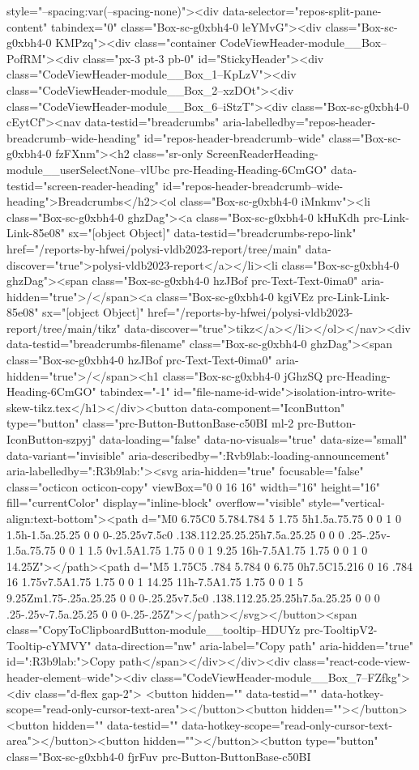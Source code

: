 {{{{{{{{{{{{{{{{{{{{{{{{{{{{{style="--spacing:var(--spacing-none)"><div data-selector="repos-split-pane-content" tabindex="0" class="Box-sc-g0xbh4-0 leYMvG"><div class="Box-sc-g0xbh4-0 KMPzq"><div class="container CodeViewHeader-module__Box--PofRM"><div class="px-3 pt-3 pb-0" id="StickyHeader"><div class="CodeViewHeader-module__Box_1--KpLzV"><div class="CodeViewHeader-module__Box_2--xzDOt"><div class="CodeViewHeader-module__Box_6--iStzT"><div class="Box-sc-g0xbh4-0 cEytCf"><nav data-testid="breadcrumbs" aria-labelledby="repos-header-breadcrumb--wide-heading" id="repos-header-breadcrumb--wide" class="Box-sc-g0xbh4-0 fzFXnm"><h2 class="sr-only ScreenReaderHeading-module__userSelectNone--vlUbc prc-Heading-Heading-6CmGO" data-testid="screen-reader-heading" id="repos-header-breadcrumb--wide-heading">Breadcrumbs</h2><ol class="Box-sc-g0xbh4-0 iMnkmv"><li class="Box-sc-g0xbh4-0 ghzDag"><a class="Box-sc-g0xbh4-0 kHuKdh prc-Link-Link-85e08" sx="[object Object]" data-testid="breadcrumbs-repo-link" href="/reports-by-hfwei/polysi-vldb2023-report/tree/main" data-discover="true">polysi-vldb2023-report</a></li><li class="Box-sc-g0xbh4-0 ghzDag"><span class="Box-sc-g0xbh4-0 hzJBof prc-Text-Text-0ima0" aria-hidden="true">/</span><a class="Box-sc-g0xbh4-0 kgiVEz prc-Link-Link-85e08" sx="[object Object]" href="/reports-by-hfwei/polysi-vldb2023-report/tree/main/tikz" data-discover="true">tikz</a></li></ol></nav><div data-testid="breadcrumbs-filename" class="Box-sc-g0xbh4-0 ghzDag"><span class="Box-sc-g0xbh4-0 hzJBof prc-Text-Text-0ima0" aria-hidden="true">/</span><h1 class="Box-sc-g0xbh4-0 jGhzSQ prc-Heading-Heading-6CmGO" tabindex="-1" id="file-name-id-wide">isolation-intro-write-skew-tikz.tex</h1></div><button data-component="IconButton" type="button" class="prc-Button-ButtonBase-c50BI ml-2 prc-Button-IconButton-szpyj" data-loading="false" data-no-visuals="true" data-size="small" data-variant="invisible" aria-describedby=":Rvb9lab:-loading-announcement" aria-labelledby=":R3b9lab:"><svg aria-hidden="true" focusable="false" class="octicon octicon-copy" viewBox="0 0 16 16" width="16" height="16" fill="currentColor" display="inline-block" overflow="visible" style="vertical-align:text-bottom"><path d="M0 6.75C0 5.784.784 5 1.75 5h1.5a.75.75 0 0 1 0 1.5h-1.5a.25.25 0 0 0-.25.25v7.5c0 .138.112.25.25.25h7.5a.25.25 0 0 0 .25-.25v-1.5a.75.75 0 0 1 1.5 0v1.5A1.75 1.75 0 0 1 9.25 16h-7.5A1.75 1.75 0 0 1 0 14.25Z"></path><path d="M5 1.75C5 .784 5.784 0 6.75 0h7.5C15.216 0 16 .784 16 1.75v7.5A1.75 1.75 0 0 1 14.25 11h-7.5A1.75 1.75 0 0 1 5 9.25Zm1.75-.25a.25.25 0 0 0-.25.25v7.5c0 .138.112.25.25.25h7.5a.25.25 0 0 0 .25-.25v-7.5a.25.25 0 0 0-.25-.25Z"></path></svg></button><span class="CopyToClipboardButton-module__tooltip--HDUYz prc-TooltipV2-Tooltip-cYMVY" data-direction="nw" aria-label="Copy path" aria-hidden="true" id=":R3b9lab:">Copy path</span></div></div><div class="react-code-view-header-element--wide"><div class="CodeViewHeader-module__Box_7--FZfkg"><div class="d-flex gap-2"> <button hidden="" data-testid="" data-hotkey-scope="read-only-cursor-text-area"></button><button hidden=""></button><button hidden="" data-testid="" data-hotkey-scope="read-only-cursor-text-area"></button><button hidden=""></button><button type="button" class="Box-sc-g0xbh4-0 fjrFuv prc-Button-ButtonBase-c50BI }}}}}}}}}}}}}}}}}}}}}}}}}}}}}
